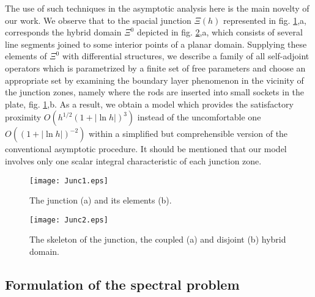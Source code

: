 \documentclass[11pt]{article}%
\numberwithin{equation}{section}
\begin{document}
The use of such techniques in the asymptotic analysis here is the main novelty
of our work. We observe that to the spacial junction $\Xi(h)$ represented in
fig. \ref{f1},a, corresponds the hybrid domain $\Xi^{0}$ depicted in fig.
\ref{f2},a, which consists of several line segments joined to some interior
points of a planar domain. Supplying these elements of $\Xi^{0}$ with
differential structures, we describe a family of all self-adjoint operators
which is parametrized by a finite set of free parameters and choose an
appropriate set by examining the boundary layer phenomenon in the vicinity of
the junction zones, namely where the rods are inserted into small sockets in
the plate, fig. \ref{f1},b. As a result, we obtain a model which provides the
satisfactory proximity $O(h^{1/2}(1+|\ln h|)^{3})$ instead of the
uncomfortable one $O((1+|\ln h|)^{-2})$ within a simplified but comprehensible
version of the conventional asymptotic procedure. It should be mentioned that
our model involves only one scalar integral characteristic of each junction zone.

\begin{figure}[ptb]
\begin{center}
\texttt{[image: Junc1.eps]}
\end{center}
\caption{The junction (a) and its elements (b).}%
\label{f1}%
\end{figure}

\begin{figure}[ptb]
\begin{center}
\texttt{[image: Junc2.eps]}
\end{center}
\caption{The skeleton of the junction, the coupled (a) and disjoint (b) hybrid
domain.}%
\label{f2}%
\end{figure}

\subsection{Formulation of the spectral problem\label{sect1.2}}
\end{document}
